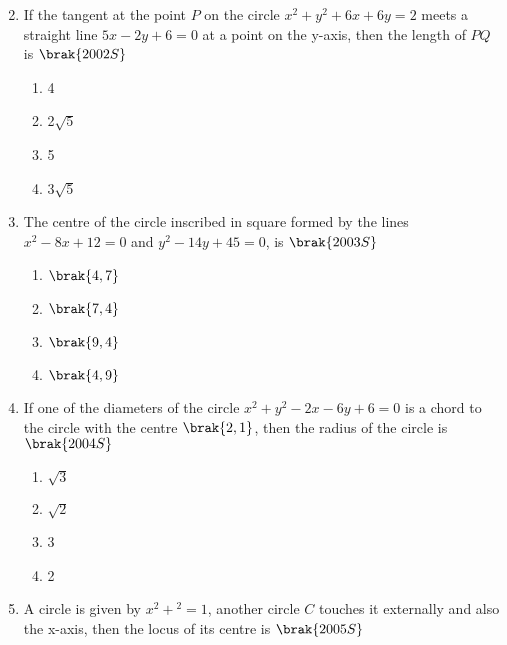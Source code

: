 \begin{enumerate}
\begin{multicols}{2}
     \end{multicols}
     \item If the tangent at the point $P$ on the circle $x^2+y^2+6x+6y=2$ meets a straight line $5x-2y+6=0$ at a point on the y-axis,  then the length of $PQ$ is 
             \hfill$\brak{2002S}$
             \begin{multicols}{2}
         \begin{enumerate}
             \item 4
             \item 2$\sqrt5$
             \item 5
             \item 3$\sqrt5$
\end{enumerate}
\end{multicols}
     \item The centre of the circle inscribed in square formed by the lines $x^2-8x+12=0$ and $y^2-14y+45=0$,  is
         \hfill$\brak{2003S}$
         \begin{multicols}{2}
     \begin{enumerate}
         \item $\brak{4, 7}$
         \item $\brak{7, 4}$
         \item $\brak{9, 4}$
         \item $\brak{4, 9}$
     \end{enumerate}
     \end{multicols}
     \item If one of the diameters of the circle $x^2+y^2-2x-6y+6=0$ is a chord to the circle with the centre $\brak{2, 1}$, then the radius of the circle is 
         \hfill$\brak{2004S}$
         \begin{multicols}{2}
     \begin{enumerate}
         \item $\sqrt3$
         \item $\sqrt2$
         \item 3
         \item 2
     \end{enumerate}
     \end{multicols}
     \item A circle is given by $x^2+$$^2=1$,  another circle $C$ touches it externally and also the x-axis,  then the locus of its centre is
         \hfill$\brak{2005S}$
         \begin{multicols}{2}
     \begin{enumerate}

\end{enumerate}
\end{multicols}
\end{enumerate}
